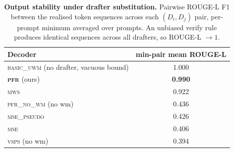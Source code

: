 \documentclass{article}
\theoremstyle{plain}
\theoremstyle{definition}
\begin{document}
\begin{table}[h]
\centering
\caption{\textbf{Output quality.}
\textsc{lppl}$\downarrow$ under target.
ROUGE-L$\uparrow$ vs.\ gold \texttt{highlights}.
AATPS$\uparrow$ accepted target tokens per step.}
\label{tab:exp1_quality}
\small
\setlength{\tabcolsep}{4pt}
\end{table}

\begin{table}[h]
\centering
\caption{\textbf{Output stability under drafter substitution.}
Pairwise ROUGE-L F1 between the realised token sequences across each
$(D_i,D_j)$ pair, per-prompt minimum averaged over prompts. An
unbiased verify rule produces identical sequences across all
drafters, so ROUGE-L $\to 1$.}
\label{tab:exp2_pairwise_rouge}
\small
\setlength{\tabcolsep}{8pt}
\begin{tabular}{lc}
\toprule
Decoder & min-pair mean ROUGE-L \\
\midrule
\textsc{basic\_uwm} (no drafter, vacuous bound) & 1.000 \\
\textbf{\textsc{pfr}} (ours)                    & \textbf{0.990} \\
\textsc{mws}                                    & 0.922 \\
\midrule
\textsc{pfr\_no\_wm} (no wm)                    & 0.436 \\
\textsc{mse\_pseudo}                            & 0.426 \\
\textsc{mse}                                    & 0.406 \\
\textsc{vsps} (no wm)                           & 0.394 \\
\bottomrule
\end{tabular}
\end{table}
\end{document}

